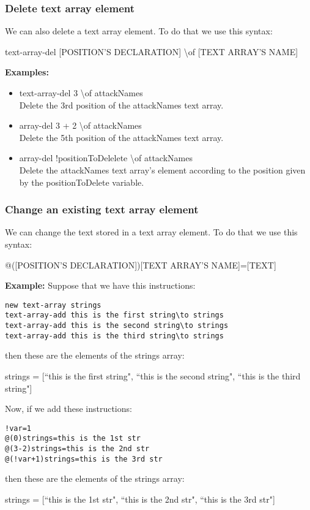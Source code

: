 \documentclass[11pt,a4paper,openright,oneside]{book}
\newenvironment{exs}
{
  \setlength{\parindent}{0cm}
  \large \textbf{Examples:} \normalsize
}
{}
\newenvironment{ex}
{
  \setlength{\parindent}{0cm}
  \large \textbf{Example:} \normalsize 
}
{}
\begin{document}
\subsubsection{Delete text array element}
We can also delete a text array element. To do that we use this syntax:
\begin{center} \textsf{text-array-del \textsc{\scriptsize[POSITION'S DECLARATION]} \textbackslash of \textsc{\scriptsize[TEXT ARRAY'S NAME]}} \normalsize \end{center}
\begin{exs} 
  \begin{itemize}
    \item \textsf{text-array-del 3 \textbackslash of attackNames} \\
    Delete the 3rd position of the \textsf{attackNames} text array.
    \item \textsf{array-del 3 + 2 \textbackslash of attackNames} \\
    Delete the 5th position of the \textsf{attackNames} text array.
    \item \textsf{array-del !positionToDelelete \textbackslash of attackNames} \\
    Delete the \textsf{attackNames} text array's element according to the position given by the \textsf{positionToDelete} variable.
  \end{itemize}
\end{exs}

\subsubsection{Change an existing text array element}
We can change the text stored in a text array element. To do that we use this syntax:
\begin{center} \textsf{@(\textsc{\scriptsize[POSITION'S DECLARATION]})\textsc{\scriptsize[TEXT ARRAY'S NAME]}=\textsc{\scriptsize[TEXT]}} \normalsize \end{center}
\begin{ex} Suppose that we have this instructions:
\begin{lstlisting}
new text-array strings
text-array-add this is the first string\to strings
text-array-add this is the second string\to strings
text-array-add this is the third string\to strings
\end{lstlisting}
then these are the elements of the \textsf{strings} array:
\begin{center} \textsf{strings = [``this is the first string", ``this is the second string", ``this is the third string"]} \end{center}
Now, if we add these instructions:
\begin{lstlisting}
!var=1
@(0)strings=this is the 1st str
@(3-2)strings=this is the 2nd str
@(!var+1)strings=this is the 3rd str
\end{lstlisting}
then these are the elements of the \textsf{strings} array:
\begin{center} \textsf{strings = [``this is the 1st str", ``this is the 2nd str", ``this is the 3rd str"]} \end{center}
\end{ex}
\end{document}
